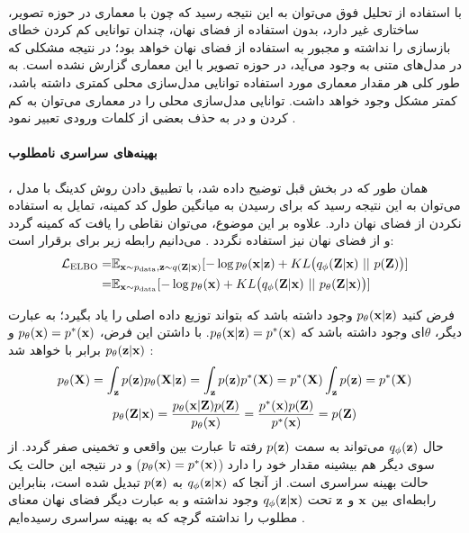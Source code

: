 \\
با استفاده از تحلیل فوق می‌توان به این نتیجه رسید که چون \vae{} با معماری 
 در حوزه تصویر، ساختاری  غیر \autoregressive{} دارد، بدون استفاده از فضای نهان، چندان توانایی کم کردن خطای بازسازی را نداشته و مجبور به استفاده از فضای نهان خواهد بود؛ در نتیجه مشکلی که در مدل‌های متنی به وجود می‌آید، در حوزه تصویر با این معماری گزارش نشده است. به طور کلی هر مقدار معماری مورد استفاده توانایی مدل‌سازی محلی کمتری داشته باشد، کمتر مشکل وجود خواهد داشت. توانایی مدل‌سازی محلی را در معماری \cnn{} می‌توان به کم کردن \receiptivefield{} و در \lstm{} به حذف بعضی از کلمات ورودی تعبیر نمود \cite{vae_lossy, vae_dialated, vae_hybrid}.
\paragraph*{بهینه‌های سراسری نامطلوب}
همان ‌طور که در بخش قبل توضیح داده شد، با تطبیق دادن روش کدینگ   با مدل \vae{}، می‌توان به این نتیجه رسید که \decoder{} برای رسیدن به میانگین طول کد کمینه، تمایل به استفاده نکردن از فضای نهان دارد. علاوه بر این موضوع، می‌توان نقاطی را یافت که  کمینه گردد و از فضای نهان نیز استفاده نگردد \cite{infovae}. می‌دانیم رابطه زیر برای  برقرار است:
\begin{align}
	\mathcal{L}_{\text{ELBO}} = & \mathbb E_{{\bf x} \sim p_\text{data}, {\bf z} \sim q({\bf Z}|{\bf x})} [- \log p_\theta({\bf x}|{\bf z}) + KL\big(q_\phi({\bf Z}|{\bf x}) ~ || ~ p({\bf Z})\big)] \nonumber
	\\
	=                           & \mathbb E_{{\bf x} \sim p_\text{data}} [-\log p_\theta({\bf x}) + KL\big(q_\phi({\bf Z}|{\bf x}) ~||~ p_\theta({\bf Z}|{\bf x})\big)] \nonumber
\end{align}

فرض کنید $p_\theta({\bf x}|{\bf z})$ وجود داشته باشد که بتواند توزیع داده اصلی را یاد بگیرد؛ به عبارت دیگر، $\theta$ای وجود داشته باشد که $p_\theta({\bf x}|{\bf z}) = p^*({\bf x})$. با داشتن این فرض،
$p_\theta({\bf x}) = p^*({\bf x})$
و
$p_\theta({\bf z}|{\bf x})$
برابر با \priordist{} خواهد شد \cite{infovae}:
\begin{gather}
	p_\theta({\bf X}) = \int_{\bf z} p({\bf z}) p_\theta({\bf X}|{\bf z})  = \int_{\bf z} p({\bf z}) p^*({\bf X}) = p^*({\bf X}) \int_{\bf z} p({\bf z}) = p^*({\bf X})
	\\
	p_\theta({\bf Z}|{\bf x}) = \frac{p_\theta({\bf x}|{\bf Z}) p({\bf Z})}{p_\theta({\bf x})} = \frac{p^*({\bf x}) p({\bf Z})}{p^*({\bf x})} = p({\bf Z})
\end{gather}
حال $q_\phi({\bf z})$ می‌تواند به سمت $p({\bf z})$ رفته تا عبارت  بین \posterior{} واقعی و تخمینی صفر گردد. از سوی دیگر هم \likelihood{} بیشینه مقدار خود را دارد ($p_\theta({\bf x}) = p^*({\bf x})$) و در نتیجه این حالت یک حالت بهینه سراسری است. از آنجا که $q_\phi({\bf z}|{\bf x})$ به $p({\bf z})$ تبدیل شده است، بنابراین رابطه‌ای بین ${\bf x}$ و ${\bf z}$ تحت $q_\phi({\bf z}|{\bf x})$ وجود نداشته و به عبارت دیگر فضای نهان معنای مطلوب را نداشته گرچه که به بهینه سراسری رسیده‌ایم \cite{infovae}.
